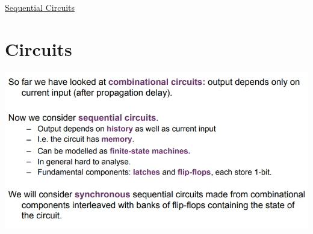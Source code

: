 \documentclass{article}[18pt]
\begin{document}
\begin{center}
\underline{\huge Sequential Circuits}
\end{center}
\section{Circuits}
\begin{center}
	\includegraphics[scale=0.7]{figure1}
\end{center}
\end{document}

